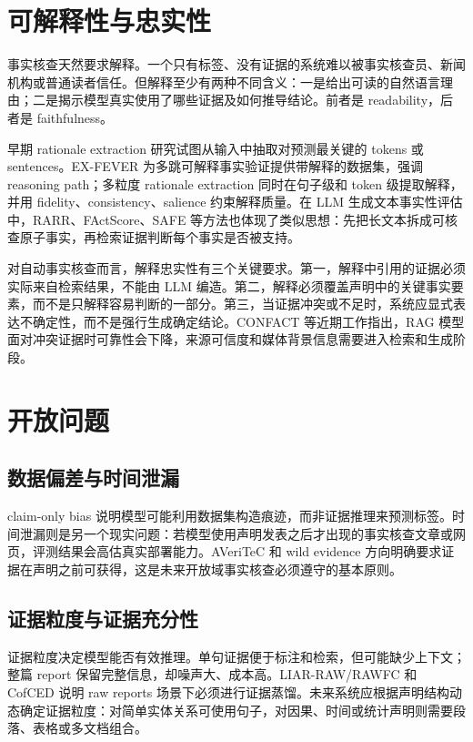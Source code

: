 \documentclass[UTF8,a4paper,zihao=5,twocolumn]{ctexart}
\begin{document}
\section{可解释性与忠实性}

事实核查天然要求解释。一个只有标签、没有证据的系统难以被事实核查员、新闻机构或普通读者信任。但解释至少有两种不同含义：一是给出可读的自然语言理由；二是揭示模型真实使用了哪些证据及如何推导结论。前者是 readability，后者是 faithfulness。

早期 rationale extraction 研究试图从输入中抽取对预测最关键的 tokens 或 sentences。EX-FEVER 为多跳可解释事实验证提供带解释的数据集，强调 reasoning path\cite{Ma2023EXFEVER}；多粒度 rationale extraction 同时在句子级和 token 级提取解释，并用 fidelity、consistency、salience 约束解释质量\cite{Si2023Rationale}。在 LLM 生成文本事实性评估中，RARR、FActScore、SAFE 等方法也体现了类似思想：先把长文本拆成可核查原子事实，再检索证据判断每个事实是否被支持\cite{Gao2022RARR,Min2023FActScore,Wei2024SAFE}。

对自动事实核查而言，解释忠实性有三个关键要求。第一，解释中引用的证据必须实际来自检索结果，不能由 LLM 编造。第二，解释必须覆盖声明中的关键事实要素，而不是只解释容易判断的一部分。第三，当证据冲突或不足时，系统应显式表达不确定性，而不是强行生成确定结论。CONFACT 等近期工作指出，RAG 模型面对冲突证据时可靠性会下降，来源可信度和媒体背景信息需要进入检索和生成阶段\cite{Ge2025CONFACT}。

\section{开放问题}

\subsection{数据偏差与时间泄漏}

claim-only bias 说明模型可能利用数据集构造痕迹，而非证据推理来预测标签\cite{Schuster2019Debiasing}。时间泄漏则是另一个现实问题：若模型使用声明发表之后才出现的事实核查文章或网页，评测结果会高估真实部署能力。AVeriTeC 和 wild evidence 方向明确要求证据在声明之前可获得，这是未来开放域事实核查必须遵守的基本原则\cite{Schlichtkrull2023AVeriTeC,Chen2023WildEvidence}。

\subsection{证据粒度与证据充分性}

证据粒度决定模型能否有效推理。单句证据便于标注和检索，但可能缺少上下文；整篇 report 保留完整信息，却噪声大、成本高。LIAR-RAW/RAWFC 和 CofCED 说明 raw reports 场景下必须进行证据蒸馏\cite{Yang2022CofCED}。未来系统应根据声明结构动态确定证据粒度：对简单实体关系可使用句子，对因果、时间或统计声明则需要段落、表格或多文档组合。
\end{document}
